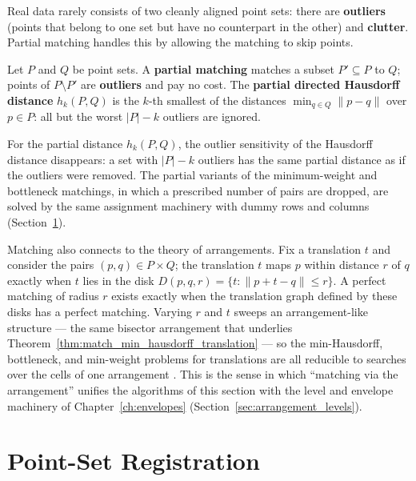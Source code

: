 Real data rarely consists
of two cleanly aligned point sets: there are \textbf{outliers} (points that
belong to one set but have no counterpart in the other) and
\textbf{clutter}. Partial matching handles this by allowing the matching to
skip points.

\begin{definition}\label{def:match_partial_matching}
  Let $P$ and $Q$ be point sets. A \textbf{partial matching} matches a
  subset $P' \subseteq P$ to $Q$; points of $P \setminus P'$ are
  \textbf{outliers} and pay no cost. The \textbf{partial directed Hausdorff
  distance} $h_k(P,Q)$ is the $k$-th smallest of the distances
  $\min_{q \in Q} \|p - q\|$ over $p \in P$: all but the worst $|P| - k$
  outliers are ignored.
\end{definition}

For the partial distance $h_k(P,Q)$, the outlier sensitivity of the Hausdorff
distance disappears: a set with $|P| - k$ outliers has the same partial
distance as if the outliers were removed. The partial variants of the
minimum-weight and bottleneck matchings, in which a prescribed number of
pairs are dropped, are solved by the same assignment machinery with dummy
rows and columns (Section~\ref{sec:matching_registration}).

Matching also connects to the theory of
arrangements. Fix a translation $t$ and consider the pairs
$(p,q) \in P \times Q$; the translation $t$ maps $p$ within distance $r$ of
$q$ exactly when $t$ lies in the disk $D(p,q,r) = \{ t : \|p + t - q\| \le
r \}$. A perfect matching of radius $r$ exists exactly when the translation
graph defined by these disks has a perfect matching. Varying $r$ and $t$
sweeps an arrangement-like structure --- the same bisector arrangement that
underlies Theorem~\ref{thm:match_min_hausdorff_translation} --- so the
min-Hausdorff, bottleneck, and min-weight problems for translations are all
reducible to searches over the cells of one arrangement
\cite{alt1999}. This is the sense in which ``matching via the arrangement''
unifies the algorithms of this section with the level and envelope machinery
of Chapter~\ref{ch:envelopes} (Section~\ref{sec:arrangement_levels}).


\section{Point-Set Registration}
\label{sec:matching_registration}

